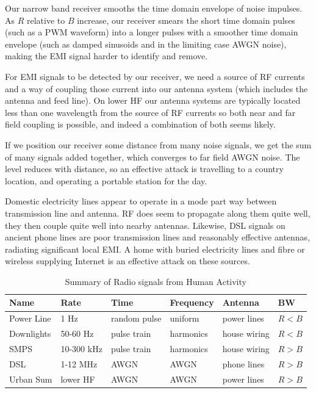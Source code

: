 \documentclass{article}
\begin{document}
Our narrow band receiver smooths the time domain envelope of noise impulses. As $R$ relative to $B$ increase, our receiver smears the short time domain pulses (such as a PWM waveform) into a longer pulses with a smoother time domain envelope (such as damped sinusoids and in the limiting case AWGN noise), making the EMI signal harder to identify and remove.

For EMI signals to be detected by our receiver, we need a source of RF currents and a way of coupling those current into our antenna system (which includes the antenna and feed line).  On lower HF our antenna systems are typically located less than one wavelength from the source of RF currents so both near and far field coupling is possible, and indeed a combination of both seems likely.

If we position our receiver some distance from many noise signals, we get the sum of many signals added together, which converges to far field AWGN noise.  The level reduces with distance, so an effective attack is travelling to a country location, and operating a portable station for the day.

Domestic electricity lines appear to operate in a mode part way between transmission line and antenna.  RF does seem to propagate along them quite well, they then couple quite well into nearby antennas.  Likewise, DSL signals on ancient phone lines are poor transmission lines and reasonably effective antennas, radiating significant local EMI. A home with buried electricity lines and fibre or wireless supplying Internet is an effective attack on these sources.

\begin{table}[h]
\centering
\begin{tabular}{l l l l l l}
 \hline
 Name & Rate & Time & Frequency & Antenna & BW \\
 \hline
 Power Line & 1 Hz & random pulse & uniform & power lines & $R < B$ \\
 Downlights & 50-60 Hz & pulse train & harmonics & house wiring & $R < B$ \\
 SMPS & 10-300 kHz & pulse train & harmonics & house wiring & $R > B$ \\
 DSL & 1-12 MHz & AWGN & AWGN & phone lines & $R > B$ \\
 Urban Sum & lower HF & AWGN & AWGN & power lines & $R > B$ \\
 \hline
\end{tabular}
\caption{Summary of Radio signals from Human Activity}
\label{table:human_noise}
\end{table}
\end{document}
